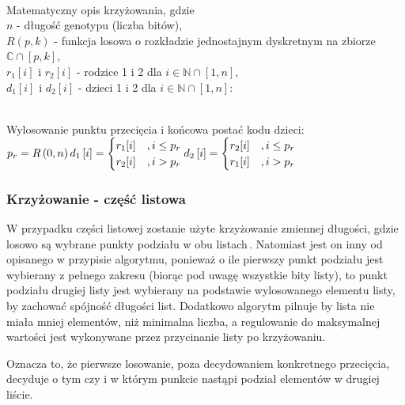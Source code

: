 \noindent\\
Matematyczny opis krzyżowania, gdzie\\
$n$ - długość genotypu (liczba bitów),\\
$R\left(p, k\right)$ - funkcja losowa o rozkładzie jednostajnym dyskretnym
  na zbiorze $\mathbb{C} \cap \left[p, k\right]$,\\
$r_1\left[i\right]$ i $r_2\left[i\right]$ -
  rodzice 1 i 2 dla
  $i \in \mathbb{N} \cap \left[1, n\right]$,\\
$d_1\left[i\right]$ i $d_2\left[i\right]$ -
  dzieci 1 i 2 dla
  $i \in \mathbb{N} \cap \left[1, n\right]$:

\noindent\\
Wylosowanie punktu przecięcia i końcowa postać kodu dzieci:\\
$\displaystyle
  p_r=R\left(0, n\right)\\
  d_1\left[i\right]=\begin{cases}
    r_1[i]
      &, i \le p_r\\
    r_2[i]
      &, i>p_r\\
  \end{cases}\\
  d_2\left[i\right]=\begin{cases}
    r_2[i]
      &, i \le p_r\\
    r_1[i]
      &, i>p_r\\
  \end{cases}
$

\subsubsection{Krzyżowanie - część listowa}
W przypadku części listowej zostanie użyte krzyżowanie zmiennej długości,
gdzie losowo są wybrane punkty podziału w obu listach\,.
Natomiast jest on inny od opisanego w przypisie algorytmu,
ponieważ o ile pierwszy punkt podziału jest wybierany z pełnego zakresu
(biorąc pod uwagę wszystkie bity listy),
to punkt podziału drugiej listy jest wybierany na podstawie
wylosowanego elementu listy, by zachować spójność długości list.
Dodatkowo algorytm pilnuje by lista nie miała mniej elementów,
niż minimalna liczba, a regulowanie do maksymalnej wartości
jest wykonywane przez przycinanie listy po krzyżowaniu.

\noindent
Oznacza to, że pierwsze losowanie,
poza decydowaniem konkretnego przecięcia, decyduje o tym czy
i w którym punkcie nastąpi podział elementów w drugiej liście.

